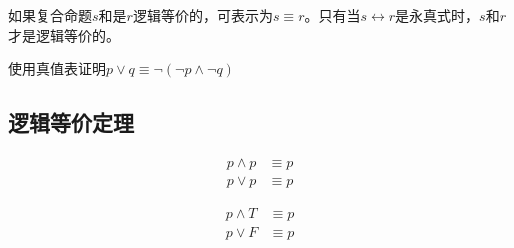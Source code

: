 \documentclass[12pt, openany, oneside]{book}
\begin{document}
如果复合命题$ s $和是$ r $逻辑等价的，可表示为$ s \equiv r $。只有当$ s \leftrightarrow r $是永真式时，$ s $和$ r $才是逻辑等价的。

\begin{tcolorbox}
	使用真值表证明$ p \vee q \equiv \neg (\neg p \wedge \neg q) $
	\begin{table}[H]
		\centering
	\end{table}
\end{tcolorbox}

\subsection{逻辑等价定理}

\begin{tcolorbox}
	\begin{align}
		p \wedge p & \equiv p \\
		p \vee p   & \equiv p
	\end{align}
\end{tcolorbox}

\begin{tcolorbox}
	\begin{align}
		p \wedge T & \equiv p \\
		p \vee F   & \equiv p
	\end{align}
\end{tcolorbox}
\end{document}
